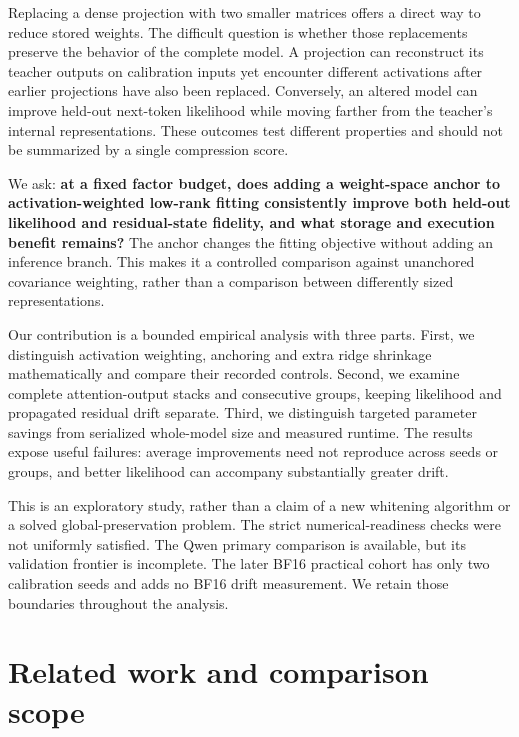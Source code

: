 \documentclass[10pt]{article}
\begin{document}
Replacing a dense projection with two smaller matrices offers a direct way to reduce stored weights. The difficult question is whether those replacements preserve the behavior of the complete model. A projection can reconstruct its teacher outputs on calibration inputs yet encounter different activations after earlier projections have also been replaced. Conversely, an altered model can improve held-out next-token likelihood while moving farther from the teacher's internal representations. These outcomes test different properties and should not be summarized by a single compression score.

We ask: \textbf{at a fixed factor budget, does adding a weight-space anchor to activation-weighted low-rank fitting consistently improve both held-out likelihood and residual-state fidelity, and what storage and execution benefit remains?} The anchor changes the fitting objective without adding an inference branch. This makes it a controlled comparison against unanchored covariance weighting, rather than a comparison between differently sized representations.

Our contribution is a bounded empirical analysis with three parts. First, we distinguish activation weighting, anchoring and extra ridge shrinkage mathematically and compare their recorded controls. Second, we examine complete attention-output stacks and consecutive groups, keeping likelihood and propagated residual drift separate. Third, we distinguish targeted parameter savings from serialized whole-model size and measured runtime. The results expose useful failures: average improvements need not reproduce across seeds or groups, and better likelihood can accompany substantially greater drift.

This is an exploratory study, rather than a claim of a new whitening algorithm or a solved global-preservation problem. The strict numerical-readiness checks were not uniformly satisfied. The Qwen primary comparison is available, but its validation frontier is incomplete. The later BF16 practical cohort has only two calibration seeds and adds no BF16 drift measurement. We retain those boundaries throughout the analysis.

\section{Related work and comparison scope}
\end{document}
